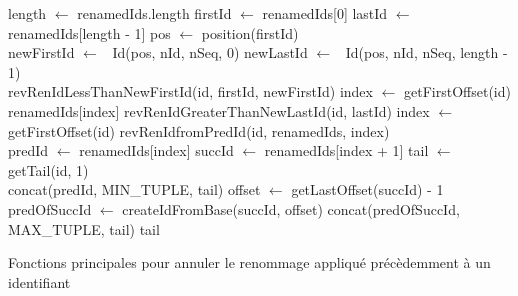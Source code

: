 \begin{algorithm}[!ht]
  \footnotesize
  \begin{algorithmic}
          \State length $\gets$ renamedIds.length
          \State firstId $\gets$ renamedIds[0]
          \State lastId $\gets$ renamedIds[length - 1]
          \State pos $\gets$ position(firstId)
          \\
          \State newFirstId $\gets$ \new~Id(pos, nId, nSeq, 0)
          \State newLastId $\gets$ \new~Id(pos, nId, nSeq, length - 1)
          \\
              \State \Return revRenIdLessThanNewFirstId(id, firstId, newFirstId)
              \State index $\gets$ getFirstOffset(id)
              \State \Return renamedIds[index]
              \State \Return revRenIdGreaterThanNewLastId(id, lastId)
          \Else
              \State index $\gets$ getFirstOffset(id)
              \State \Return revRenIdfromPredId(id, renamedIds, index)
          \EndIf
      \EndFunction
      \\
          \State predId $\gets$ renamedIds[index]
          \State succId $\gets$ renamedIds[index + 1]
          \State tail $\gets$ getTail(id, 1)
          \\
              \State {}
              \State \Return concat(predId, MIN\_TUPLE, tail)
              \State {}
              \State offset $\gets$ getLastOffset(succId) - 1
              \State predOfSuccId $\gets$ createIdFromBase(succId, offset)
              \State \Return concat(predOfSuccId, MAX\_TUPLE, tail)
          \Else
              \State \Return tail
          \EndIf
      \EndFunction
  \end{algorithmic}
  \caption{Fonctions principales pour annuler le renommage appliqué précèdemment à un identifiant}
  \label{alg:revertRenameId}
\end{algorithm}

